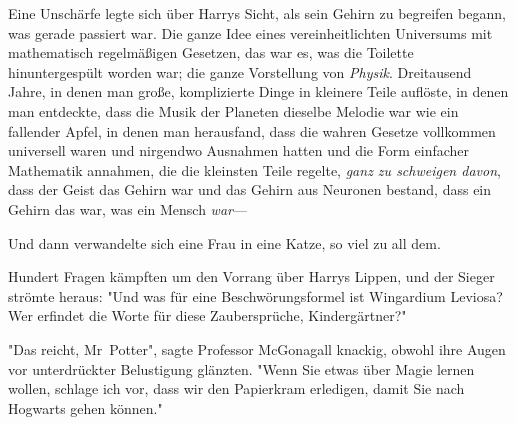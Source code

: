 Eine Unschärfe legte sich über Harrys Sicht, als sein Gehirn zu begreifen begann, was gerade passiert war. Die ganze Idee eines vereinheitlichten Universums mit mathematisch regelmäßigen Gesetzen, das war es, was die Toilette hinuntergespült worden war; die ganze Vorstellung von \emph{Physik}. Dreitausend Jahre, in denen man große, komplizierte Dinge in kleinere Teile auflöste, in denen man entdeckte, dass die Musik der Planeten dieselbe Melodie war wie ein fallender Apfel, in denen man herausfand, dass die wahren Gesetze vollkommen universell waren und nirgendwo Ausnahmen hatten und die Form einfacher Mathematik annahmen, die die kleinsten Teile regelte, \emph{ganz zu schweigen davon}, dass der Geist das Gehirn war und das Gehirn aus Neuronen bestand, dass ein Gehirn das war, was ein Mensch \emph{war}—

Und dann verwandelte sich eine Frau in eine Katze, so viel zu all dem.

Hundert Fragen kämpften um den Vorrang über Harrys Lippen, und der Sieger strömte heraus: "Und was für eine Beschwörungsformel ist Wingardium Leviosa? Wer erfindet die Worte für diese Zaubersprüche, Kindergärtner?"

"Das reicht, Mr~Potter", sagte Professor McGonagall knackig, obwohl ihre Augen vor unterdrückter Belustigung glänzten. "Wenn Sie etwas über Magie lernen wollen, schlage ich vor, dass wir den Papierkram erledigen, damit Sie nach Hogwarts gehen können."


